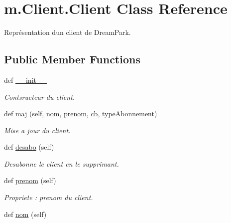 \hypertarget{classm_1_1_client_1_1_client}{}\section{m.\+Client.\+Client Class Reference}
\label{classm_1_1_client_1_1_client}


Représentation d\textquotesingle{}un client de Dream\+Park.  


\subsection*{Public Member Functions}
\begin{DoxyCompactItemize}
\item 
def \hyperlink{classm_1_1_client_1_1_client_a5d4ee9add0ad8db1294691e5908d8e0a}{\+\_\+\+\_\+init\+\_\+\+\_\+}
\begin{DoxyCompactList}\small\item\em Contsructeur du client. \end{DoxyCompactList}\item 
def \hyperlink{classm_1_1_client_1_1_client_ae3da82c785429201360e19b757630d19}{maj} (self, \hyperlink{classm_1_1_client_1_1_client_a6e88f5232df3d822d9372b8917b80764}{nom}, \hyperlink{classm_1_1_client_1_1_client_a8a9d3e3c4198c1290ccf5596c6bfcb8d}{prenom}, \hyperlink{classm_1_1_client_1_1_client_acfc771bedeb851068a978bacac44eb3e}{cb}, type\+Abonnement)
\begin{DoxyCompactList}\small\item\em Mise a jour du client. \end{DoxyCompactList}\item 
\hypertarget{classm_1_1_client_1_1_client_a488f458730b69ae4df43b8501b4ea6cf}{}def \hyperlink{classm_1_1_client_1_1_client_a488f458730b69ae4df43b8501b4ea6cf}{desabo} (self)\label{classm_1_1_client_1_1_client_a488f458730b69ae4df43b8501b4ea6cf}

\begin{DoxyCompactList}\small\item\em Desabonne le client en le supprimant. \end{DoxyCompactList}\item 
\hypertarget{classm_1_1_client_1_1_client_a8a9d3e3c4198c1290ccf5596c6bfcb8d}{}def \hyperlink{classm_1_1_client_1_1_client_a8a9d3e3c4198c1290ccf5596c6bfcb8d}{prenom} (self)\label{classm_1_1_client_1_1_client_a8a9d3e3c4198c1290ccf5596c6bfcb8d}

\begin{DoxyCompactList}\small\item\em Propriete \+: prenom du client. \end{DoxyCompactList}\item 
\hypertarget{classm_1_1_client_1_1_client_a6e88f5232df3d822d9372b8917b80764}{}def \hyperlink{classm_1_1_client_1_1_client_a6e88f5232df3d822d9372b8917b80764}{nom} (self)\label{classm_1_1_client_1_1_client_a6e88f5232df3d822d9372b8917b80764}


\end{DoxyCompactItemize}
